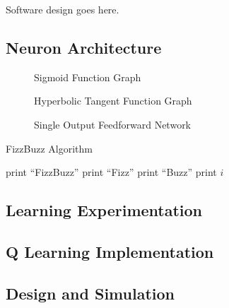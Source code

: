 Software design goes here.

\subsection{Neuron Architecture}

\begin{figure}
	\centering
	
	\caption{Sigmoid Function Graph}
\end{figure}

\begin{figure}[h]
	\centering
	
	\caption{Hyperbolic Tangent Function Graph}
\end{figure}

\begin{figure}[h]
	\centering
	
	\caption{Single Output Feedforward Network}
\end{figure}

\begin{algorithm}[!ht]
	\caption{FizzBuzz Algorithm}
	\begin{algorithmic}[1]
				\State print ``FizzBuzz''
				\State print ``Fizz''
				\State print ``Buzz''
			\Else
				\State print $i$
			\EndIf
		\EndFor
	\end{algorithmic}
\end{algorithm}

\subsection{Learning Experimentation}


\subsection{Q Learning Implementation}

\subsection{Design and Simulation}
